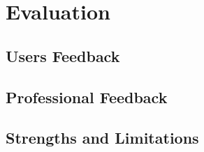 \documentclass[master.tex]{subfiles}
\begin{document}
\chapter{Evaluation}

\section{Users Feedback}

\section{Professional Feedback}

\section{Strengths and Limitations}



\end{document}

